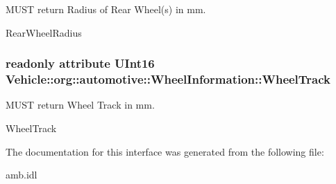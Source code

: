 M\-U\-S\-T return Radius of Rear Wheel(s) in mm. 

Rear\-Wheel\-Radius \hypertarget{interfaceVehicle_1_1org_1_1automotive_1_1WheelInformation_afb7fbec6fefa9cbb13abd3766b496f64}{
\subsubsection[{Wheel\-Track}]{\setlength{\rightskip}{0pt plus 5cm}readonly attribute U\-Int16 Vehicle\-::org\-::automotive\-::\-Wheel\-Information\-::\-Wheel\-Track}}\label{interfaceVehicle_1_1org_1_1automotive_1_1WheelInformation_afb7fbec6fefa9cbb13abd3766b496f64}


M\-U\-S\-T return Wheel Track in mm. 

Wheel\-Track 

The documentation for this interface was generated from the following file\-:\begin{DoxyCompactItemize}
\item 
amb.\-idl\end{DoxyCompactItemize}
